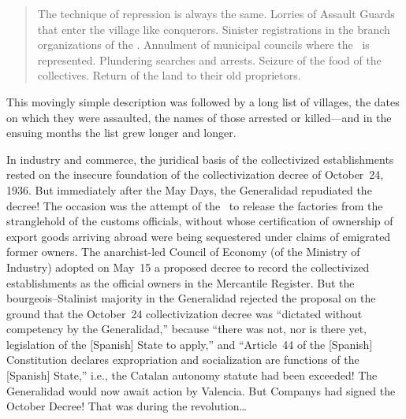 \begin{quotation}
  The technique of repression is always the same. Lorries of Assault Guards that enter the village like conquerors. Sinister registrations in the branch organizations of the \CNT. Annulment of municipal councils where the \CNT\ is represented. Plundering searches and arrests. Seizure of the food of the collectives. Return of the land to their old proprietors.
\end{quotation}

This movingly simple description was followed by a long list of villages, the dates on which they were assaulted, the names of those arrested or killed---and in the ensuing months the list grew longer and longer.

In industry and commerce, the juridical basis of the collectivized establishments rested on the insecure foundation of the collectivization decree of October~24, 1936. But immediately after the May Days, the Generalidad repudiated the decree! The occasion was the attempt of the \CNT\ to release the factories from the stranglehold of the customs officials, without whose certification of ownership of export goods arriving abroad were being sequestered under claims of emigrated former owners. The anarchist-led Council of Economy (of the Ministry of Industry) adopted on May~15 a proposed decree to record the collectivized establishments as the official owners in the Mercantile Register. But the bourgeois--Stalinist majority in the Generalidad rejected the proposal on the ground that the October~24 collectivization decree was ``dictated without competency by the Generalidad,'' because ``there was not, nor is there yet, legislation of the [Spanish] State to apply,'' and ``Article~44 of the [Spanish] Constitution declares expropriation and socialization are functions of the [Spanish] State,'' i.e., the Catalan autonomy statute had been exceeded! The Generalidad would now await action by Valencia. But Companys had signed the October Decree! That was during the revolution\dots

\dinkus

